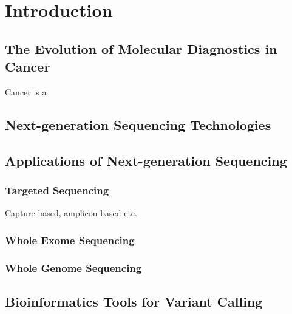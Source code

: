 
\chapter{Introduction}
\label{ch:Introduction}

\section{The Evolution of Molecular Diagnostics in Cancer}
\label{sec:The Evolution of Molecular Diagnostics in Cancer}

Cancer is a 


\section{Next-generation Sequencing Technologies}
\label{sec:Next-generationSequencingTechnologies}


\section{Applications of Next-generation Sequencing}
\label{sec:ApplicationsofNext-generationSequencing}

\subsection{Targeted Sequencing}
Capture-based, amplicon-based etc.

\subsection{Whole Exome Sequencing}

\subsection{Whole Genome Sequencing}

\section{Bioinformatics Tools for Variant Calling}
\label{sec:BioinformaticsToolsforVariantCalling}

